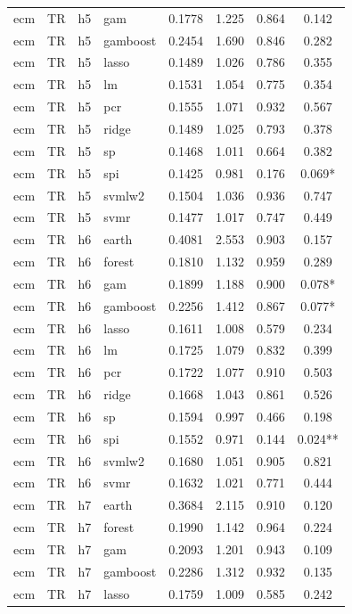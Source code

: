 \begin{ThreePartTable}
\begin{longtable}[t]{llclcccc}
ecm & TR & h5 & gam & 0.1778 & 1.225 & 0.864 & 0.142\\
ecm & TR & h5 & gamboost & 0.2454 & 1.690 & 0.846 & 0.282\\
ecm & TR & h5 & lasso & 0.1489 & 1.026 & 0.786 & 0.355\\
ecm & TR & h5 & lm & 0.1531 & 1.054 & 0.775 & 0.354\\
ecm & TR & h5 & pcr & 0.1555 & 1.071 & 0.932 & 0.567\\
ecm & TR & h5 & ridge & 0.1489 & 1.025 & 0.793 & 0.378\\
ecm & TR & h5 & sp & 0.1468 & 1.011 & 0.664 & 0.382\\
ecm & TR & h5 & spi & 0.1425 & 0.981 & 0.176 & 0.069*\\
ecm & TR & h5 & svmlw2 & 0.1504 & 1.036 & 0.936 & 0.747\\
ecm & TR & h5 & svmr & 0.1477 & 1.017 & 0.747 & 0.449\\
\addlinespace
ecm & TR & h6 & earth & 0.4081 & 2.553 & 0.903 & 0.157\\
ecm & TR & h6 & forest & 0.1810 & 1.132 & 0.959 & 0.289\\
ecm & TR & h6 & gam & 0.1899 & 1.188 & 0.900 & 0.078*\\
ecm & TR & h6 & gamboost & 0.2256 & 1.412 & 0.867 & 0.077*\\
ecm & TR & h6 & lasso & 0.1611 & 1.008 & 0.579 & 0.234\\
ecm & TR & h6 & lm & 0.1725 & 1.079 & 0.832 & 0.399\\
ecm & TR & h6 & pcr & 0.1722 & 1.077 & 0.910 & 0.503\\
ecm & TR & h6 & ridge & 0.1668 & 1.043 & 0.861 & 0.526\\
ecm & TR & h6 & sp & 0.1594 & 0.997 & 0.466 & 0.198\\
ecm & TR & h6 & spi & 0.1552 & 0.971 & 0.144 & 0.024**\\
ecm & TR & h6 & svmlw2 & 0.1680 & 1.051 & 0.905 & 0.821\\
ecm & TR & h6 & svmr & 0.1632 & 1.021 & 0.771 & 0.444\\
\addlinespace
ecm & TR & h7 & earth & 0.3684 & 2.115 & 0.910 & 0.120\\
ecm & TR & h7 & forest & 0.1990 & 1.142 & 0.964 & 0.224\\
ecm & TR & h7 & gam & 0.2093 & 1.201 & 0.943 & 0.109\\
ecm & TR & h7 & gamboost & 0.2286 & 1.312 & 0.932 & 0.135\\
ecm & TR & h7 & lasso & 0.1759 & 1.009 & 0.585 & 0.242\\

\end{longtable}
\end{ThreePartTable}
